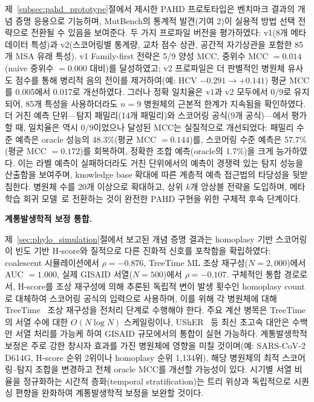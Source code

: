 제~\ref{subsec:pahd_prototype}절에서 제시한 PAHD 프로토타입은 벤치마크 결과의 개념 증명 응용으로 기능하며, MutBench의 통계적 발견(기여 2)이 실용적 방법 선택 전략으로 전환될 수 있음을 보여준다.
두 가지 프로파일 버전을 평가하였다: v1(8개 메타데이터 특성)과 v2(스코어링별 통계량, 교차 점수 상관, 공간적 자기상관을 포함한 85개 MSA 유래 특성).
v1 Family-first 전략은 5/9 양성 MCC, 중위수 MCC $= 0.014$(naive 중위수 $= 0.000$ 대비)를 달성하였고; v2 프로파일은 더 판별적인 병원체 유사도 점수를 통해 병리적 음의 전이를 제거하여(예: HCV $-0.291 \rightarrow +0.141$) 평균 MCC를 0.005에서 0.017로 개선하였다.
그러나 정확 일치율은 v1과 v2 모두에서 0/9로 유지되어, 85개 특성을 사용하더라도 $n = 9$ 병원체의 근본적 한계가 지속됨을 확인하였다.
더 거친 예측 단위---탐지 패밀리(14개 패밀리)와 스코어링 공식(9개 공식)---에서 평가할 때, 일치율은 역시 0/9이었으나 달성된 MCC는 실질적으로 개선되었다: 패밀리 수준 예측은 oracle 성능의 48.3\%(평균 MCC $= 0.144$)를, 스코어링 수준 예측은 57.7\%(평균 MCC $= 0.172$)를 회복하여, 정확한 조합 예측(oracle의 1.7\%)을 크게 능가하였다.
이는 라벨 예측이 실패하더라도 거친 단위에서의 예측이 경쟁력 있는 탐지 성능을 산출함을 보여주며, knowledge base 확대에 따른 계층적 예측 접근법의 타당성을 뒷받침한다.
병원체 수를 20개 이상으로 확대하고, 상위 $k$개 앙상블 전략을 도입하며, 메타학습 회귀 모델~\cite{rice1976algorithm,kerschke2019algorithm}로 전환하는 것이 완전한 PAHD 구현을 위한 구체적 후속 단계이다.

\textbf{계통발생학적 보정 통합.}

제~\ref{sec:phylo_simulation}절에서 보고된 개념 증명 결과는 homoplasy 기반 스코어링이 빈도 기반 H-score와 질적으로 다른 진화적 신호를 포착함을 확립하였다: coalescent 시뮬레이션에서 $\rho = -0.876$, TreeTime ML 조상 재구성($N = 2{,}000$)에서 AUC $= 1.000$, 실제 GISAID 서열($N = 500$)에서 $\rho = -0.107$.
구체적인 통합 경로로서, H-score를 조상 재구성에 의해 추론된 독립적 변이 발생 횟수인 homoplasy count로 대체하여 스코어링 공식의 입력으로 사용하며, 이를 위해 각 병원체에 대해 TreeTime~\cite{sagulenko2018treetime} 조상 재구성을 전처리 단계로 수행해야 한다.
주요 계산 병목은 TreeTime의 서열 수에 대한 $O(N \log N)$ 스케일링이나, UShER~\cite{turakhia2020ultrafast} 등 최신 초고속 대안은 수백만 서열 처리를 가능케 하여 GISAID 규모에서의 통합이 실현 가능하다.
계통발생학적 보정은 주로 강한 창시자 효과를 가진 병원체에 영향을 미칠 것이며(예: SARS-CoV-2 D614G, H-score 순위 2위이나 homoplasy 순위 1,134위), 해당 병원체의 최적 스코어링--탐지 조합을 변경하고 전체 oracle MCC를 개선할 가능성이 있다.
시기별 서열 비율을 정규화하는 시간적 층화(temporal stratification)는 트리 위상과 독립적으로 시퀀싱 편향을 완화하여 계통발생학적 보정을 보완할 것이다.

